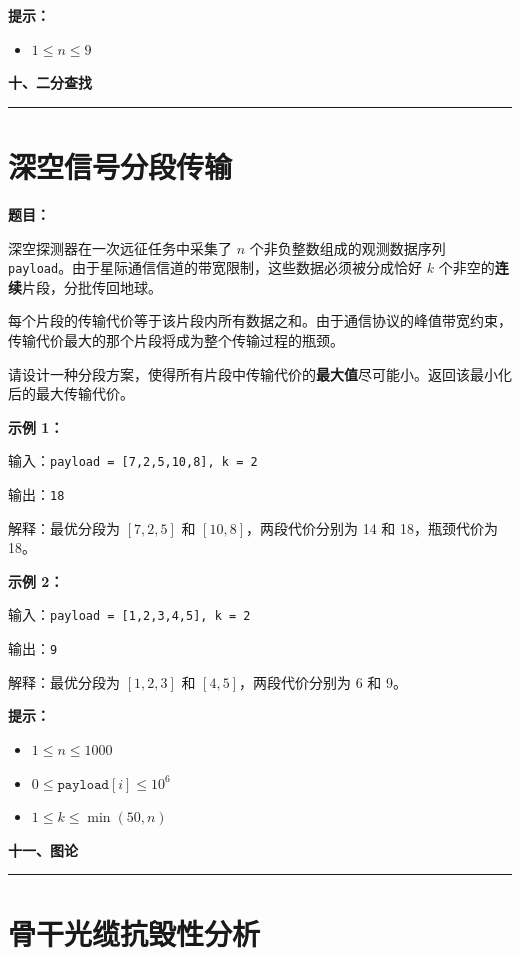 \documentclass[12pt, a4paper]{article}
\newcommand{\category}[1]{%
  \vspace{1.2cm}
  {\noindent\Large\bfseries #1}
  \vspace{0.2em}\par
  \noindent\rule{\textwidth}{0.8pt}
  \vspace{0.2em}
}
\begin{document}
\textbf{提示：}
\begin{itemize}[leftmargin=2em]
  \item $1 \leq n \leq 9$
\end{itemize}



\category{十、二分查找}

\section{深空信号分段传输}

\noindent\textbf{题目：}

深空探测器在一次远征任务中采集了 $n$ 个非负整数组成的观测数据序列 \texttt{payload}。由于星际通信信道的带宽限制，这些数据必须被分成恰好 $k$ 个非空的\textbf{连续}片段，分批传回地球。

每个片段的传输代价等于该片段内所有数据之和。由于通信协议的峰值带宽约束，传输代价最大的那个片段将成为整个传输过程的瓶颈。

请设计一种分段方案，使得所有片段中传输代价的\textbf{最大值}尽可能小。返回该最小化后的最大传输代价。

\textbf{示例 1：}

输入：\texttt{payload = [7,2,5,10,8], k = 2}

输出：\texttt{18}

解释：最优分段为 $[7,2,5]$ 和 $[10,8]$，两段代价分别为 14 和 18，瓶颈代价为 18。

\textbf{示例 2：}

输入：\texttt{payload = [1,2,3,4,5], k = 2}

输出：\texttt{9}

解释：最优分段为 $[1,2,3]$ 和 $[4,5]$，两段代价分别为 6 和 9。

\textbf{提示：}
\begin{itemize}[leftmargin=2em]
  \item $1 \leq n \leq 1000$
  \item $0 \leq \texttt{payload}[i] \leq 10^6$
  \item $1 \leq k \leq \min(50, n)$
\end{itemize}



\category{十一、图论}

\section{骨干光缆抗毁性分析}
\end{document}
